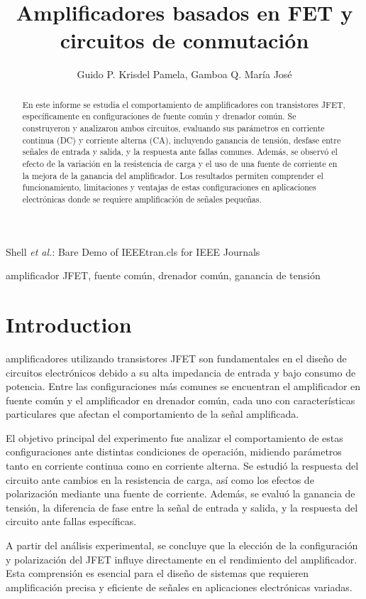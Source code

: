 \documentclass[journal]{IEEEtran}
\begin{document}
\title{Amplificadores basados en FET y circuitos de conmutación}
\author{Guido P. Krisdel Pamela, Gamboa Q. María José} 
{Shell \MakeLowercase{\textit{et al.}}: Bare Demo of IEEEtran.cls for IEEE Journals}

\maketitle
\renewcommand{\abstractname}{Resumen}
\begin{abstract}
En este informe se estudia el comportamiento de amplificadores con transistores JFET, específicamente en configuraciones de fuente común y drenador común. Se construyeron y analizaron ambos circuitos, evaluando sus parámetros en corriente continua (DC) y corriente alterna (CA), incluyendo ganancia de tensión, desfase entre señales de entrada y salida, y la respuesta ante fallas comunes. Además, se observó el efecto de la variación en la resistencia de carga y el uso de una fuente de corriente en la mejora de la ganancia del amplificador. Los resultados permiten comprender el funcionamiento, limitaciones y ventajas de estas configuraciones en aplicaciones electrónicas donde se requiere amplificación de señales pequeñas.
\end{abstract}

\renewcommand{\IEEEkeywordsname}{Palabras clave}
\begin{IEEEkeywords}
amplificador JFET, fuente común, drenador común, ganancia de tensión
\end{IEEEkeywords}

\IEEEpeerreviewmaketitle

\section{Introduction}
amplificadores utilizando transistores JFET son fundamentales en el diseño de circuitos electrónicos debido a su alta impedancia de entrada y bajo consumo de potencia. Entre las configuraciones más comunes se encuentran el amplificador en fuente común y el amplificador en drenador común, cada uno con características particulares que afectan el comportamiento de la señal amplificada.
\par El objetivo principal del experimento fue analizar el comportamiento de estas configuraciones ante distintas condiciones de operación, midiendo parámetros tanto en corriente continua como en corriente alterna. Se estudió la respuesta del circuito ante cambios en la resistencia de carga, así como los efectos de polarización mediante una fuente de corriente. Además, se evaluó la ganancia de tensión, la diferencia de fase entre la señal de entrada y salida, y la respuesta del circuito ante fallas específicas.
\par A partir del análisis experimental, se concluye que la elección de la configuración y polarización del JFET influye directamente en el rendimiento del amplificador. Esta comprensión es esencial para el diseño de sistemas que requieren amplificación precisa y eficiente de señales en aplicaciones electrónicas variadas.
\end{document}
